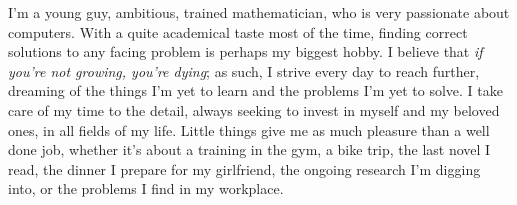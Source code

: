 I’m a young guy, ambitious, trained mathematician, who is very passionate about computers. With a quite academical taste most of the time, finding correct solutions to any facing problem is perhaps my biggest hobby. I believe that \textit{if you're not growing, you're dying}; as such, I strive every day to reach further, dreaming of the things I'm yet to learn and the problems I'm yet to solve. I take care of my time to the detail, always seeking to invest in myself and my beloved ones, in all fields of my life. Little things give me as much pleasure than a well done job, whether it's about a training in the gym, a bike trip, the last novel I read, the dinner I prepare for my girlfriend, the ongoing research I'm digging into, or the problems I find in my workplace.